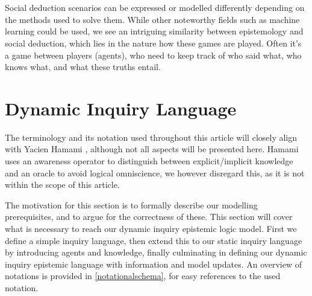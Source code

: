 \\\\

Social deduction scenarios can be expressed or modelled differently depending
on the methods used to solve them. While other noteworthy fields such as
machine learning could be used, we see an intriguing similarity
between epistemology and social deduction, which lies in the nature how these
games are played. Often it's a game between players (agents), who need to keep
track of who said what, who knows what, and what these truths entail.

\section{Dynamic Inquiry Language}
The terminology and its notation used throughout this article will closely
align with Yacien Hamami \cite{delimi}, although not all aspects will be
presented here. Hamami uses an awareness operator to distinguish between
explicit/implicit knowledge and an oracle to avoid logical omniscience, we
however disregard this, as it is not within the scope of this article.

The motivation for this section is to formally describe our modelling
prerequisites, and to argue for the correctness of these. This section will
cover what is necessary to reach our dynamic inquiry epistemic logic model.
First we define a simple inquiry language, then extend this to our static
inquiry language by introducing agents and knowledge, finally culminating in
defining our dynamic inquiry epistemic language with information and model
updates. An overview of notations is provided in \cref{notationalschema}, for
easy references to the used notation.

\newpage


